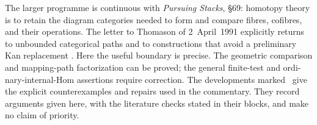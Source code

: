 \begin{otherlanguage}{english}
The larger programme is continuous with \emph{Pursuing Stacks}, \S69: homotopy
theory is to retain the diagram categories needed to form and compare fibres,
cofibres, and their operations.  The letter to Thomason of 2~April~1991
explicitly returns to unbounded categorical paths and to constructions that
avoid a preliminary Kan replacement
\citep{Grothendieck1983,Grothendieck1991Letter}.  Here the useful boundary is
precise.  The geometric comparison and mapping-path factorization can be
proved; the general finite-test and ordinary-internal-Hom assertions require
correction.  The developments marked \ours\ give the explicit counterexamples
and repairs used in the commentary.  They record arguments given here,
with the literature checks stated in their blocks, and make no claim of
priority.



\endgroup
\end{otherlanguage}
\dgrchunkend

